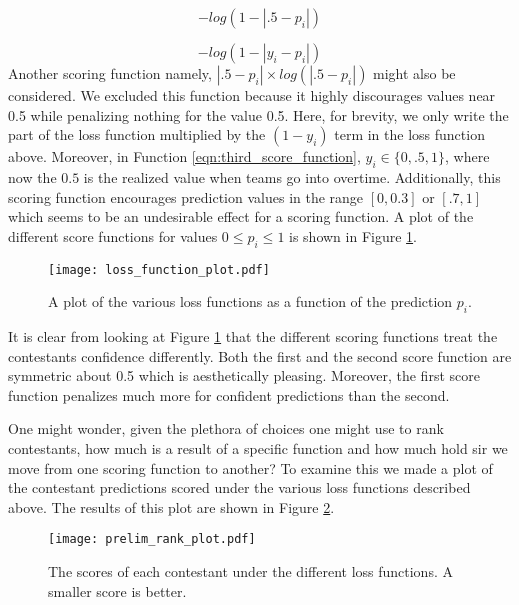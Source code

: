 \begin{equation}\label{eqn:second_score_function}
-log(1-|.5-p_i|)
\end{equation} 

\begin{equation}\label{eqn:third_score_function}
-log(1-|y_i-p_i|)
\end{equation} 
Another scoring function namely, $|.5-p_i|\times log(|.5-p_i|)$ might also be considered. We excluded this function because it highly discourages values near 0.5 while penalizing nothing for the value 0.5. Here, for brevity, we only write the part of the loss function multiplied by the $(1-y_i)$ term in the loss function above. Moreover, in Function \ref{eqn:third_score_function}, $y_i \in \{0,.5,1\}$, where now the $0.5$ is the realized value when teams go into overtime. Additionally, this scoring function encourages prediction values in the range $[0,0.3]$ or $[.7,1]$ which seems to be an undesirable effect for a scoring function. A plot of the different score functions for values $0\leq p_i \leq 1$ is shown in Figure \ref{fig:scoring_functions}.  

\begin{figure}[H]
\centering
\texttt{[image: loss\_function\_plot.pdf]}
\caption{A plot of the various loss functions as a function of the prediction $p_i$.  }
\label{fig:scoring_functions}
\end{figure}

It is clear from looking at Figure \ref{fig:scoring_functions} that the different scoring functions treat the contestants confidence differently. Both the first and the second score function are symmetric about 0.5 which is aesthetically pleasing. Moreover, the first score function penalizes much more for confident predictions than the second. 

One might wonder, given the plethora of choices one might use to rank contestants, how much is a result of a specific function and how much hold sir we move from one scoring function to another? To examine this we made a plot of the contestant predictions scored under the various loss functions described above. The results of this plot are shown in Figure \ref{fig:score_rank_plot}. 


  \begin{figure}[H]
\centering
\texttt{[image: prelim\_rank\_plot.pdf]}
\caption{The scores of each contestant under the different loss functions. A smaller score is better.  }
\label{fig:score_rank_plot}
\end{figure}


